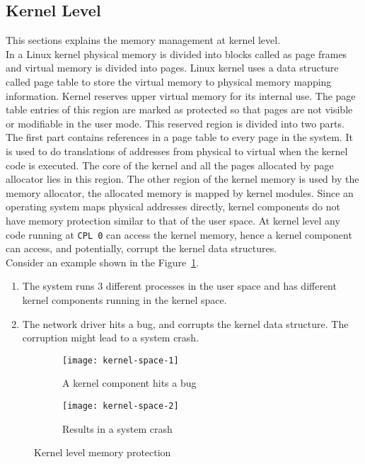 \subsection{Kernel Level}
\label{subsec:kernel level}
This sections explains the memory management at kernel level. 
\\[3mm]
In a Linux kernel physical memory is divided into blocks called as page frames and virtual memory is divided into pages. Linux kernel uses a data structure called page table to store the virtual memory to physical memory mapping information. Kernel reserves upper virtual memory for its internal use. The page table entries of this region are marked as protected so that pages are not visible or modifiable in the user mode. This reserved region is divided into two parts. The first part contains references in a page table to every page in the system. It is used to do translations of addresses from physical to virtual when the kernel code is executed. The core of the kernel and all the pages allocated by page allocator lies in this region. The other region of the kernel memory is used by the memory allocator, the allocated memory is mapped by kernel modules. Since an operating system maps physical addresses directly, kernel components do not have memory protection similar to that of the user space. At kernel level any code running at \texttt{CPL 0} can access the kernel memory, hence a kernel component can access, and potentially, corrupt the kernel data structures. 
\\[3mm]
Consider an example shown in the Figure~\ref{fig:Kernel space}.
\begin{enumerate}
\item The system runs 3 different processes in the user space and has different kernel components running in the kernel space.
\item The network driver hits a bug, and corrupts the kernel data structure. The corruption might lead to a system crash.
\end{enumerate}
\begin{figure}[!ht]
    \centering
    \begin{subfigure}[b]{0.49\textwidth}
	\texttt{[image: kernel-space-1]}
	\caption{A kernel component hits a bug}
    \end{subfigure}
	\hfill
    \begin{subfigure}[b]{0.49\textwidth}
	\texttt{[image: kernel-space-2]}
	\caption{Results in a system crash}
    \end{subfigure}
    \caption{Kernel level memory protection}\label{fig:Kernel space}
\end{figure}


